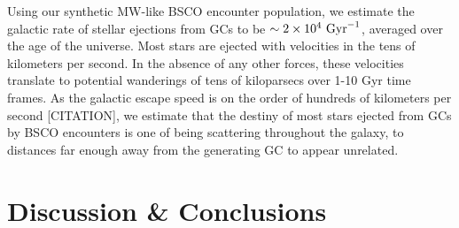 \documentclass[twocolumn]{aastex631}
\newcommand{\kms}{${\rm km \times s^{-1}}$}
\newcommand{\CMC}{\texttt{CMC}}
\begin{document}
Using our synthetic MW-like BSCO encounter population, we estimate the galactic rate of stellar ejections from GCs to be $\sim2 \times 10^4~{\rm Gyr}^{-1}$, averaged over the age of the universe.
Most stars are ejected with velocities in the tens of kilometers per second.
In the absence of any other forces, these velocities translate to potential wanderings of tens of kiloparsecs over 1-10 Gyr time frames.
As the galactic escape speed is on the order of hundreds of kilometers per second [CITATION], we estimate that the destiny of most stars ejected from GCs by BSCO encounters is one of being scattering throughout the galaxy, to distances far enough away from the generating GC to appear unrelated.


%

\section{Discussion \& Conclusions} \label{sec:disccon}
\end{document}
